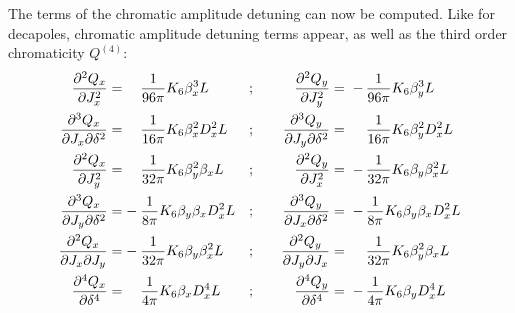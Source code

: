 The terms of the chromatic amplitude detuning can now be computed. Like for decapoles, chromatic
amplitude detuning terms appear, as well as the third order chromaticity $Q^{(4)}$:
\begin{equation}\begin{aligned}
  \frac{\partial^2 Q_x}{\partial J_x^2} =&\;                              &&\frac{1}{96\pi} K_6 \beta_x^3L                 &&;\quad     &\frac{\partial^2 Q_y}{\partial J_y^2}                 &=\; -\mkern-15mu &&\frac{1}{96\pi} K_6 \beta_y^3L \\
  \frac{\partial^3 Q_x}{\partial J_x \partial \delta^2} =&\;              &&\frac{1}{16\pi} K_6 \beta_x^2 D_x^2L           &&;\quad     &\frac{\partial^3 Q_y}{\partial J_y \partial \delta^2} &=\;              &&\frac{1}{16\pi} K_6 \beta_y^2 D_x^2L\\
  \frac{\partial^2 Q_x}{\partial J_y^2} =&\;                              &&\frac{1}{32\pi} K_6 \beta_y^2\beta_xL          &&;\quad     &\frac{\partial^2 Q_y}{\partial J_x^2}                 &=\; -\mkern-15mu &&\frac{1}{32\pi} K_6 \beta_y\beta_x^2L \\
  \frac{\partial^3 Q_x}{\partial J_y \partial \delta^2} =&\; -\mkern-15mu &&\frac{1}{8\pi} K_6 \beta_y \beta_x D_x^2L      &&;\quad     &\frac{\partial^3 Q_y}{\partial J_x \partial \delta^2} &=\; -\mkern-15mu &&\frac{1}{8\pi} K_6 \beta_y \beta_x D_x^2L\\
  \frac{\partial^2 Q_x}{\partial J_x \partial J_y} =&\;      -\mkern-15mu &&\frac{1}{32\pi} K_6 \beta_y \beta_x^2L         &&;\quad     &\frac{\partial^2 Q_y}{\partial J_y \partial J_x}      &=\;              &&\frac{1}{32\pi} K_6 \beta_y^2 \beta_xL\\
  \frac{\partial^4 Q_x}{\partial \delta^4} =&\;                           &&\frac{1}{4\pi} K_6 \beta_x D_x^4L              &&;\quad     &\frac{\partial^4 Q_y}{\partial \delta^4}              &=\; -\mkern-15mu &&\frac{1}{4\pi} K_6 \beta_y D_x^4 L\\
\end{aligned}\end{equation}


